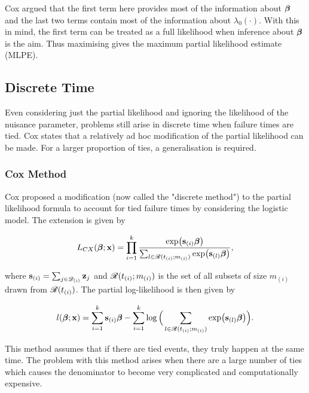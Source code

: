 Cox  argued that the first term here provides most of the information about $\boldsymbol{\beta}$ and the last two terms contain most of the information about $\lambda_0(\cdot)$. With this in mind, the first term can be treated as a full likelihood when inference about $\boldsymbol{\beta}$ is the aim. Thus maximising  gives the maximum partial likelihood estimate (MLPE).

\subsection{Discrete Time}\label{discrete-time}

Even considering just the partial likelihood and ignoring the likelihood of the nuisance parameter, problems still arise in discrete time when failure times are tied. Cox  states that a relatively ad hoc modification of the partial likelihood can be made. For a larger proportion of ties, a generalisation is required.

\subsubsection{Cox Method}

Cox  proposed a modification (now called the "discrete method") to the partial likelihood formula to account for tied failure times by considering the logistic model. The extension is given by

\begin{equation}
    L_{CX}(\boldsymbol{\beta};\textbf{x})=\prod_{i=1}^k\frac{\exp(\textbf{s}_{(i)}\boldsymbol{\beta})}{\sum_{l\in\mathscr{R}(t_{(i)};m_{(i)})}\exp(\textbf{s}_{(l)}\boldsymbol{\beta})},
\end{equation}

where $\textbf{s}_{(i)}=\sum_{j\in\mathscr{D}_{(i)}}\textbf{z}_j$ and $\mathscr{R}(t_{(i)};m_{(i)})$ is the set of all subsets of size $m_{(i)}$ drawn from $\mathscr{R}(t_{(i)})$. The partial log-likelihood is then given by

\begin{equation}
    l(\boldsymbol{\beta};\textbf{x})=\sum_{i=1}^k\textbf{s}_{(i)}\boldsymbol{\beta}-\sum_{i=1}^k\log\Big(\sum_{l\in\mathscr{R}(t_{(i)};m_{(i)})}\exp(\textbf{s}_{(l)}\boldsymbol{\beta})\Big).
\end{equation}

This method assumes that if there are tied events, they truly happen at the same time. The problem with this method arises when there are a large number of ties which causes the denominator to become very complicated and computationally expensive.

